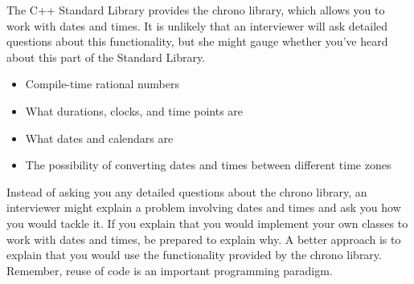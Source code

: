 
The C++ Standard Library provides the chrono library, which allows you to work with dates and times. It is unlikely that an interviewer will ask detailed questions about this functionality, but she might gauge whether you’ve heard about this part of the Standard Library.


\begin{itemize}
\item
Compile-time rational numbers

\item
What durations, clocks, and time points are

\item
What dates and calendars are

\item
The possibility of converting dates and times between different time zones
\end{itemize}


Instead of asking you any detailed questions about the chrono library, an interviewer might explain a problem involving dates and times and ask you how you would tackle it. If you explain that you would implement your own classes to work with dates and times, be prepared to explain why. A better approach is to explain that you would use the functionality provided by the chrono library. Remember, reuse of code is an important programming paradigm.

